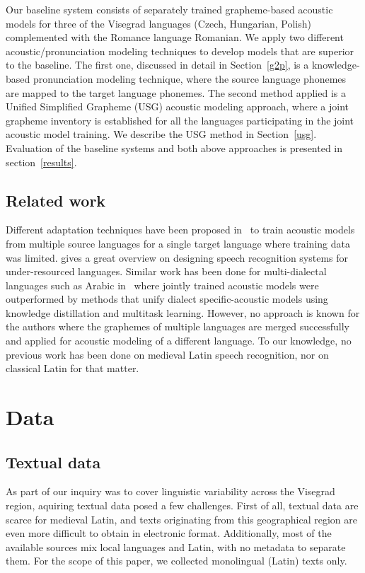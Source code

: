 \documentclass[runningheads,a4paper]{llncs}
\begin{document}
Our baseline system consists of separately trained grapheme-based acoustic models for three of the Visegrad languages (Czech, Hungarian, Polish) complemented with the Romance language Romanian.
We apply two different acoustic/pronunciation modeling techniques to develop models that are superior to the baseline.
The first one, discussed in detail in Section~\ref{g2p}, is a knowledge-based pronunciation modeling technique, where the source language phonemes are mapped to the target language phonemes.
The second method applied is a Unified Simplified Grapheme (USG) acoustic modeling approach, where a joint grapheme inventory is established for all the languages participating in the joint acoustic model training.
We describe the USG method in Section~\ref{usg}.
Evaluation of the baseline systems and both above approaches is presented in section~\ref{results}.

\subsection{Related work}
Different adaptation techniques have been proposed in~\cite{schultz01} to train acoustic models from multiple source languages for a single target language where training data was limited.
\cite{besacier14} gives a great overview on designing speech recognition systems for under-resourced languages.
Similar work has been done for multi-dialectal languages such as Arabic in~\cite{elfeky16} where jointly trained acoustic models were outperformed by methods that unify dialect specific-acoustic models using knowledge distillation and multitask learning.
However, no  approach is known for the authors where the graphemes of multiple languages are merged successfully and applied for acoustic modeling of a different language.
To our knowledge, no previous work has been done on medieval Latin speech recognition, nor on classical Latin for that matter.

\section{Data}
\subsection{Textual data}\label{text}
As part of our inquiry was to cover linguistic variability across the Visegrad region, aquiring textual data posed a few challenges.
First of all, textual data are scarce for medieval Latin, and texts originating from this geographical region are even more difficult to obtain in electronic format.
Additionally, most of the available sources mix local languages and Latin, with no metadata to separate them.
For the scope of this paper, we collected monolingual (Latin) texts only.
\end{document}
